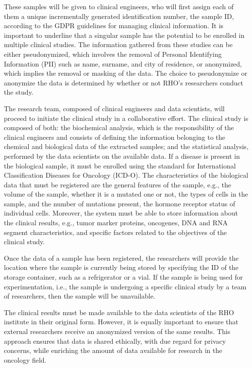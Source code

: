 These samples will be given to clinical engineers, who will first assign each of them a unique incrementally generated identification number, the sample ID, according to the GDPR guidelines for managing clinical information. It is important to underline that a singular sample has the potential to be enrolled in multiple clinical studies. The information gathered from these studies can be either pseudonymized, which involves the removal of Personal Identifying Information (PII) such as name, surname, and city of residence, or anonymized, which implies the removal or masking of the data. The choice to pseudonymize or anonymize the data is determined by whether or not RHO's researchers conduct the study.

The research team, composed of clinical engineers and data scientists, will proceed to initiate the clinical study in a collaborative effort. The clinical study is composed of both: the biochemical analysis, which is the responsibility of the clinical engineers and consists of defining the information belonging to the chemical and biological data of the extracted samples; and the statistical analysis, performed by the data scientists on the available data. If a disease is present in the biological sample, it must be enrolled using the standard for International Classification Diseases for Oncology (ICD-O). The characteristics of the biological data that must be registered are the general features of the sample, e.g., the volume of the sample, whether it is a mutated one or not, the types of cells in the sample, and the number of mutations present, the hormone receptor status of individual cells. Moreover, the system must be able to store information about the clinical results, e.g., tumor marker proteins, oncogenes, DNA and RNA segment characteristics, and specific factors related to the objectives of the clinical study.

Once the data of a sample has been registered, the researchers will provide the location where the sample is currently being stored by specifying the ID of the storage container, such as a refrigerator or a vial. If the sample is being used for experimentation, i.e., the sample is undergoing a specific clinical study by a team of researchers, then the sample will be unavailable.

The clinical results must be made available to the data scientists of the RHO institute in their original form. However, it is equally important to ensure that external researchers receive an anonymized version of the same results. This approach ensures that data is shared ethically, with due regard for privacy concerns, while enriching the amount of data available for research in the oncology field.
